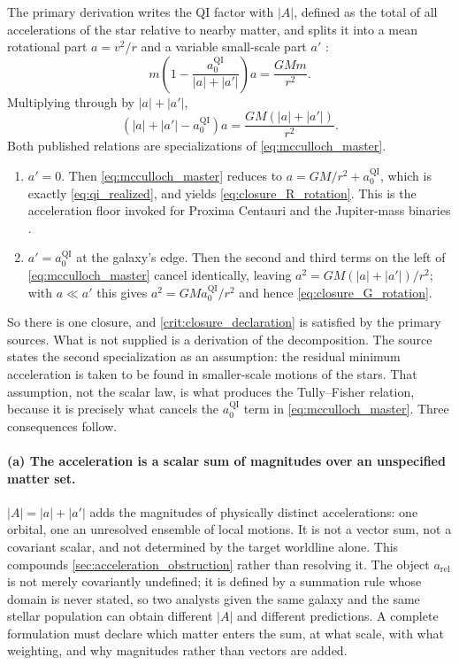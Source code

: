 \documentclass[11pt]{article}
\newcommand{\QI}{\mathrm{QI}}
\begin{document}
The primary derivation writes the QI factor with \(|A|\), defined as the total of all accelerations of the star relative to nearby matter, and splits it into a mean rotational part \(a=v^{2}/r\) and a variable small-scale part \(a'\) \cite{McCulloch2012}:
\begin{equation}
    m\left(1-\frac{a_{0}^{\QI}}{|a|+|a'|}\right)a=\frac{GMm}{r^{2}}.
    \label{eq:mcculloch_decomposed}
\end{equation}
Multiplying through by \(|a|+|a'|\),
\begin{equation}
    \left(|a|+|a'|-a_{0}^{\QI}\right)a
    =\frac{GM\left(|a|+|a'|\right)}{r^{2}}.
    \label{eq:mcculloch_master}
\end{equation}
Both published relations are specializations of \cref{eq:mcculloch_master}.
\begin{enumerate}[leftmargin=1.55em]
    \item \(a'=0\). Then \cref{eq:mcculloch_master} reduces to \(a=GM/r^{2}+a_{0}^{\QI}\), which is exactly \cref{eq:qi_realized}, and yields \cref{eq:closure_R_rotation}. This is the acceleration floor invoked for Proxima Centauri and the Jupiter-mass binaries \cite{McCulloch2024Proxima,McCulloch2026JuMBO}.
    \item \(a'=a_{0}^{\QI}\) at the galaxy's edge. Then the second and third terms on the left of \cref{eq:mcculloch_master} cancel identically, leaving \(a^{2}=GM(|a|+|a'|)/r^{2}\); with \(a\ll a'\) this gives \(a^{2}=GM a_{0}^{\QI}/r^{2}\) and hence \cref{eq:closure_G_rotation}.
\end{enumerate}

So there is one closure, and \cref{crit:closure_declaration} is satisfied by the primary sources. What is not supplied is a derivation of the decomposition. The source states the second specialization as an assumption: the residual minimum acceleration is taken to be found in smaller-scale motions of the stars. That assumption, not the scalar law, is what produces the Tully--Fisher relation, because it is precisely what cancels the \(a_{0}^{\QI}\) term in \cref{eq:mcculloch_master}. Three consequences follow.

\paragraph{(a) The acceleration is a scalar sum of magnitudes over an unspecified matter set.} \(|A|=|a|+|a'|\) adds the magnitudes of physically distinct accelerations: one orbital, one an unresolved ensemble of local motions. It is not a vector sum, not a covariant scalar, and not determined by the target worldline alone. This compounds \cref{sec:acceleration_obstruction} rather than resolving it. The object \(a_{\mathrm{rel}}\) is not merely covariantly undefined; it is defined by a summation rule whose domain is never stated, so two analysts given the same galaxy and the same stellar population can obtain different \(|A|\) and different predictions. A complete formulation must declare which matter enters the sum, at what scale, with what weighting, and why magnitudes rather than vectors are added.
\end{document}
